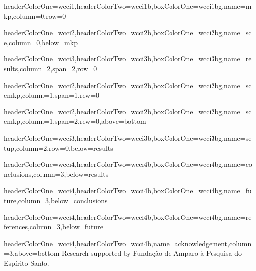\documentclass[landscape,final,a0paper,fontscale=0.38]{baposter}
\newenvironment{cframed}[1][white]
  {\begin{mdframed}[linewidth=0,backgroundcolor=#1] }
  {\end{mdframed}}
\newcommand{\myBoxEnv}[2]{\begin{cframed}[#1] #2 \end{cframed}}
\begin{document}
\begin{poster}
  {headerColorOne=wcci1,headerColorTwo=wcci1b,boxColorOne=wcci1bg,name=mkp,column=0,row=0}
  {\myBoxEnv{wcci1bg}{}}

  {headerColorOne=wcci2,headerColorTwo=wcci2b,boxColorOne=wcci2bg,name=sce,column=0,below=mkp}
  {\myBoxEnv{wcci2bg}{ }}

  {headerColorOne=wcci3,headerColorTwo=wcci3b,boxColorOne=wcci3bg,name=results,column=2,span=2,row=0}
  {\myBoxEnv{wcci3bg}{ }}

  {headerColorOne=wcci2,headerColorTwo=wcci2b,boxColorOne=wcci2bg,name=scemkp,column=1,span=1,row=0}
  {\myBoxEnv{wcci2bg}{}}

  {headerColorOne=wcci2,headerColorTwo=wcci2b,boxColorOne=wcci2bg,name=scemkp,column=1,span=2,row=0,above=bottom}
  {\myBoxEnv{wcci2bg}{ }}

  {headerColorOne=wcci3,headerColorTwo=wcci3b,boxColorOne=wcci3bg,name=setup,column=2,row=0,below=results}
  {\myBoxEnv{wcci3bg}{ }}

  {headerColorOne=wcci4,headerColorTwo=wcci4b,boxColorOne=wcci4bg,name=conclusions,column=3,below=results}
  {\myBoxEnv{wcci4bg}{ }}

  {headerColorOne=wcci4,headerColorTwo=wcci4b,boxColorOne=wcci4bg,name=future,column=3,below=conclusions}
  {\myBoxEnv{wcci4bg}{ }}

  {headerColorOne=wcci4,headerColorTwo=wcci4b,boxColorOne=wcci4bg,name=references,column=3,below=future}
  {  }

  {headerColorOne=wcci4,headerColorTwo=wcci4b,name=acknowledgement,column=3,above=bottom}
  { Research supported by Funda\c c\~ao de Amparo \`a Pesquisa do Esp\'irito Santo.  }

\end{poster}
\end{document}
